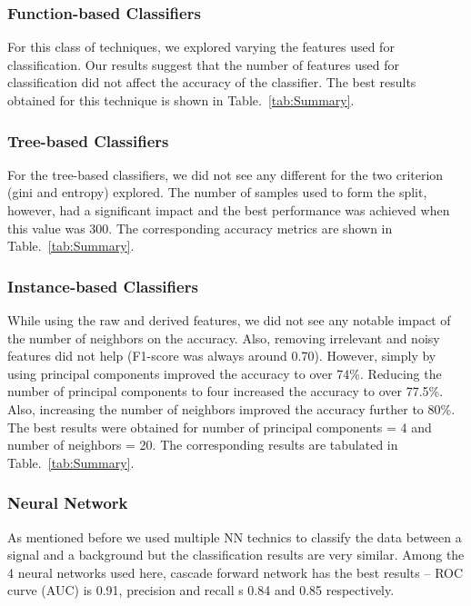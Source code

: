 \subsubsection{Function-based Classifiers}

For this class of techniques, we explored varying the features used for classification. Our results suggest that the number of features used for classification did not affect the accuracy of the classifier. The best results obtained for this technique is shown in Table.~\ref{tab:Summary}.

\subsubsection{Tree-based Classifiers}

For the tree-based classifiers, we did not see any different for the two criterion (gini and entropy) explored. The number of samples used to form the split, however, had a significant impact and the best performance was achieved when this value was 300. The corresponding accuracy metrics are shown in Table.~\ref{tab:Summary}.

\subsubsection{Instance-based Classifiers}

While using the raw and derived features, we did not see any notable impact of the number of neighbors on the accuracy. Also, removing irrelevant and noisy features did not help (F1-score was always around 0.70). However, simply by using principal components improved the accuracy to over 74\%. Reducing the number of principal components to four increased the accuracy to over 77.5\%. Also, increasing the number of neighbors improved the accuracy further to 80\%. The best results were obtained for number of principal components = 4 and number of neighbors = 20. The corresponding results are tabulated in Table.~\ref{tab:Summary}.

\subsubsection{Neural Network}
As mentioned before we used multiple NN technics to classify the data between a signal and a background but the classification results are very similar. Among the 4 neural networks used here, cascade forward network has the best results --  ROC curve (AUC) is 0.91, precision and recall s 0.84 and 0.85 respectively.  

